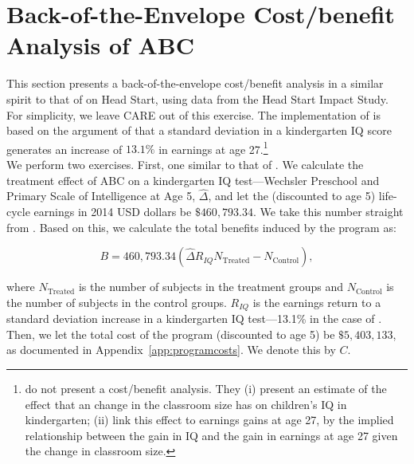 
\section{Back-of-the-Envelope Cost/benefit Analysis of ABC} \label{appendix:back}

\noindent This section presents a back-of-the-envelope cost/benefit analysis in a similar spirit to that of \citet{Kline-Walters_2015_NBER-Evaluating} on Head Start, using data from the Head Start Impact Study. For simplicity, we leave CARE out of this exercise. The implementation of \citet{Kline-Walters_2015_NBER-Evaluating} is based on the argument of  \citet{Chetty_Friedman_etal_2010_HowDoesYour} that a standard deviation in a kindergarten IQ score generates an increase of $13.1\%$ in earnings at age 27.\footnote{\citet{Chetty_Friedman_etal_2010_HowDoesYour} do not present a cost/benefit analysis. They (i) present an estimate of the effect that an change in the classroom size has on children's IQ in kindergarten; (ii) link this effect to earnings gains at age 27, by the implied relationship between the gain in IQ and the gain in earnings at age 27 given the change in classroom size.}\\

\noindent We perform two exercises. First, one similar to that of \citet{Kline-Walters_2015_NBER-Evaluating}. We calculate the treatment effect of ABC on a kindergarten IQ test---Wechsler Preschool and Primary Scale of Intelligence at Age 5, $\widehat{\Delta}$, and let the (discounted to age 5) life-cycle earnings in 2014 USD dollars be $\$460,793.34$. We take this number straight from \citet{Kline-Walters_2015_NBER-Evaluating}. Based on this, we calculate the total benefits induced by the program as: 

\begin{equation}
B = 460,793.34 \left( \widehat{\Delta} R_{IQ}  N_{\text{Treated}}  -  N_{\text{Control}} \right) , 
\end{equation}

\noindent where $N_{\text{Treated}}$ is the number of subjects in the treatment groups and $N_{\text{Control}}$ is the number of subjects in the control groups. $R_{IQ}$ is the earnings return to a standard deviation increase in a kindergarten IQ test---13.1\% in the case of \citep{Chetty_Friedman_etal_2010_HowDoesYour}. Then, we let the total cost of the program (discounted to age 5) be $\$5,403,133$, as documented in Appendix~\ref{app:programcosts}. We denote this by $C$.\\ 

